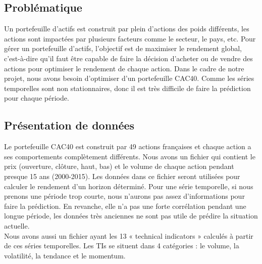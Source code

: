 \subsection{Problématique}

Un portefeuille d'actifs est construit par plein d'actions des poids différents, les actions sont impactées par plusieurs facteurs comme le secteur, le pays, etc. Pour gérer un portefeuille d'actifs, l'objectif est de maximiser le rendement global, c'est-à-dire qu'il faut être capable de faire la décision d'acheter ou de vendre des actions pour optimiser le rendement de chaque action. Dans le cadre de notre projet, nous avons besoin d’optimiser d'un portefeuille CAC40. Comme les séries temporelles sont non stationnaires, donc il est très difficile de faire la prédiction pour chaque période.

\subsection{Présentation de données}

Le portefeuille CAC40 est construit par 49 actions françaises et chaque action a ses comportements complètement différents. Nous avons un fichier qui contient le prix (ouverture, clôture, haut, bas) et le volume de chaque action pendant presque 15 ans (2000-2015). Les données dans ce fichier seront utilisées pour calculer le rendement d'un horizon déterminé. Pour une série temporelle, si nous prenons une période trop courte, nous n'aurons pas assez d'informations pour faire la prédiction. En revanche, elle n'a pas une forte corrélation pendant une longue période, les données très anciennes ne sont pas utile de prédire la situation actuelle.\\

Nous avons aussi un fichier ayant les 13 « technical indicators » calculés à partir de ces séries temporelles. Les TIs se situent dans 4 catégories : le volume, la volatilité, la tendance et le momentum.
